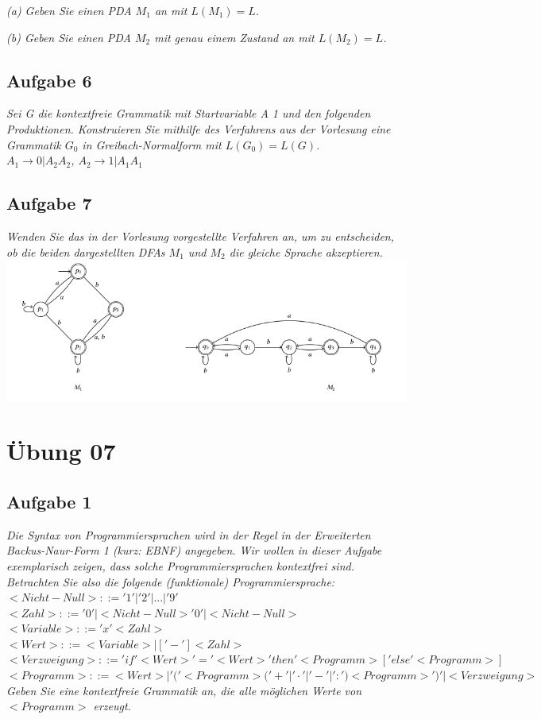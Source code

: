 \documentclass[a4paper]{article}
\begin{document}
\textit{(a) Geben Sie einen PDA $M_1$ an mit $L(M_1) = L$.}

\textit{(b) Geben Sie einen PDA $M_2$ mit genau einem Zustand an mit $L(M_2) = L$.}


\subsection{Aufgabe 6}
\textit{Sei G die kontextfreie Grammatik mit Startvariable A 1 und den folgenden Produktionen. Konstruieren Sie mithilfe des Verfahrens aus der Vorlesung eine Grammatik $G_0$ in Greibach-Normalform mit $L(G_0) = L(G)$.\\
$A_1\rightarrow 0 | A_2 A_2$, $A_2 \rightarrow 1 | A_1 A_1$}


\subsection{Aufgabe 7}
\textit{Wenden Sie das in der Vorlesung vorgestellte Verfahren an, um zu entscheiden, ob die beiden dargestellten DFAs $M_1$ und $M_2$ die gleiche Sprache akzeptieren.}
\includegraphics{Assets/ASK_uebung/u06_03.png}


\newpage
\section{Übung 07}
\subsection{Aufgabe 1}
\textit{Die Syntax von Programmiersprachen wird in der Regel in der Erweiterten Backus-Naur-Form 1 (kurz: EBNF) angegeben. Wir wollen in dieser Aufgabe exemplarisch zeigen, dass solche Programmiersprachen kontextfrei sind. Betrachten Sie also die folgende (funktionale) Programmiersprache:
$<Nicht-Null> ::= '1' | '2' | . . . |'9'$\\
$<Zahl> ::= '0' | <Nicht-Null> { '0' | <Nicht-Null> }$\\
$<Variable> ::= 'x' <Zahl>$\\
$<Wert> ::= <Variable> | [ '-' ] <Zahl>$\\
$<Verzweigung> ::= 'if' <Wert> '=' <Wert> 'then' <Programm> [ 'else' <Programm> ]$\\
$<Programm> ::= <Wert> | '(' <Programm> ( '+' | '·' | '-' | ':' ) <Programm> ')' | <Verzweigung>$\\
Geben Sie eine kontextfreie Grammatik an, die alle möglichen Werte von $<Programm>$ erzeugt.}
\end{document}
